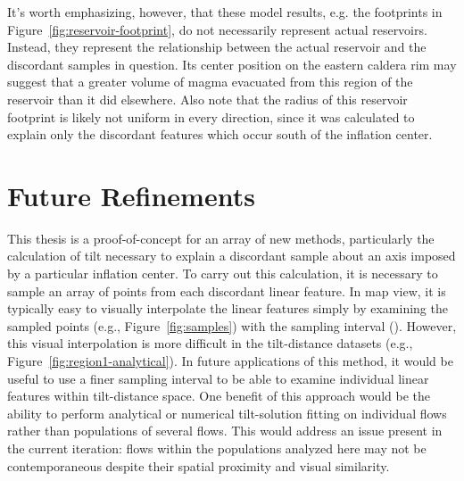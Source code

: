 It's worth emphasizing, however, that these model results, e.g. the footprints in Figure~\ref{fig:reservoir-footprint}, do not necessarily represent actual reservoirs. Instead, they represent the relationship between the actual reservoir and the discordant samples in question. Its center position on the eastern caldera rim may suggest that a greater volume of magma evacuated from this region of the reservoir than it did elsewhere. Also note that the radius of this reservoir footprint is likely not uniform in every direction, since it was calculated to explain only the discordant features which occur south of the inflation center.

\section{Future Refinements}

This thesis is a proof-of-concept for an array of new methods, particularly the calculation of tilt necessary to explain a discordant sample about an axis imposed by a particular inflation center. To carry out this calculation, it is necessary to sample an array of points from each discordant linear feature. In map view, it is typically easy to visually interpolate the linear features simply by examining the sampled points (e.g., Figure~\ref{fig:samples}) with the sampling interval (\samplinginterval). However, this visual interpolation is more difficult in the tilt-distance datasets (e.g., Figure~\ref{fig:region1-analytical}). In future applications of this method, it would be useful to use a finer sampling interval to be able to examine individual linear features within tilt-distance space. One benefit of this approach would be the ability to perform analytical or numerical tilt-solution fitting on individual flows rather than populations of several flows. This would address an issue present in the current iteration: flows within the populations analyzed here may not be contemporaneous despite their spatial proximity and visual similarity.

